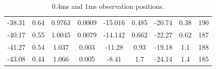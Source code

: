 \documentclass[useAMS,usenatbib]{mn2e}
\begin{document}
\begin{table}
\begin{tabular}{|c|c|c|c|c|c|c|c|c|}
-38.31                           & 0.64                               & 0.9763              & 0.0009                             & -15.016  & 0.485                                    & -20.74   & 0.38  &190                                    \\

-40.17                           & 0.55                               & 1.0045              & 0.0079                             & -14.142  & 0.662                                    & -22.27   & 0.62  &187                                   \\

-41.27                           & 0.54                               & 1.037              & 0.003                              & -11.28  & 0.93                                     & -19.18   & 1.1   &188                                   \\

-43.08                           & 0.44                               & 1.066              & 0.005                              & -8.41   & 1.7                                      & -24.14   & 1.4   &185   
                                  
\end{tabular}
\label{table:apex}
\caption{0.4ms and 1ms observation positions.}
\end{table}



\end{document}
